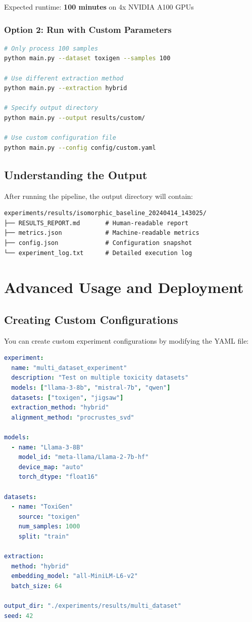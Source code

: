 \documentclass[12pt,a4paper,oneside]{report}
\begin{document}
Expected runtime: \textbf{100 minutes} on 4x NVIDIA A100 GPUs

\subsection{Option 2: Run with Custom Parameters}

\begin{lstlisting}[language=Bash]
# Only process 100 samples
python main.py --dataset toxigen --samples 100

# Use different extraction method
python main.py --extraction hybrid

# Specify output directory
python main.py --output results/custom/

# Use custom configuration file
python main.py --config config/custom.yaml
\end{lstlisting}

\section{Understanding the Output}

After running the pipeline, the output directory will contain:

\begin{lstlisting}[caption=Output Structure]
experiments/results/isomorphic_baseline_20240414_143025/
├── RESULTS_REPORT.md       # Human-readable report
├── metrics.json            # Machine-readable metrics
├── config.json             # Configuration snapshot
└── experiment_log.txt      # Detailed execution log
\end{lstlisting}

\chapter{Advanced Usage and Deployment}

\section{Creating Custom Configurations}

You can create custom experiment configurations by modifying the YAML file:

\begin{lstlisting}[language=YAML, caption=Example: custom\_experiment.yaml]
experiment:
  name: "multi_dataset_experiment"
  description: "Test on multiple toxicity datasets"
  models: ["llama-3-8b", "mistral-7b", "qwen"]
  datasets: ["toxigen", "jigsaw"]
  extraction_method: "hybrid"
  alignment_method: "procrustes_svd"

models:
  - name: "Llama-3-8B"
    model_id: "meta-llama/Llama-2-7b-hf"
    device_map: "auto"
    torch_dtype: "float16"

datasets:
  - name: "ToxiGen"
    source: "toxigen"
    num_samples: 1000
    split: "train"

extraction:
  method: "hybrid"
  embedding_model: "all-MiniLM-L6-v2"
  batch_size: 64

output_dir: "./experiments/results/multi_dataset"
seed: 42
\end{lstlisting}
\end{document}
